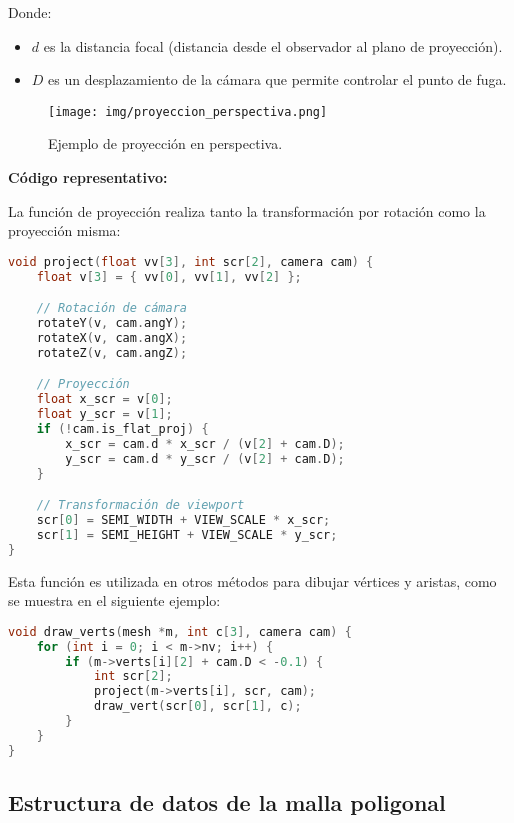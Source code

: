 \documentclass[12pt]{article}
\begin{document}
    Donde:
    \begin{itemize}
        \item \( d \) es la distancia focal (distancia desde el observador al plano de proyección).
        \item \( D \) es un desplazamiento de la cámara que permite controlar el punto de fuga.
    \end{itemize}

    \begin{figure}[H]
        \centering
        \texttt{[image: img/proyeccion\_perspectiva.png]}
        \caption{Ejemplo de proyección en perspectiva.}
    \end{figure}

    \textbf{Código representativo:}

    La función de proyección realiza tanto la transformación por rotación como la proyección misma:

    \begin{lstlisting}[language=C, caption={Función de proyección 3D a 2D}]
void project(float vv[3], int scr[2], camera cam) {
    float v[3] = { vv[0], vv[1], vv[2] };

    // Rotación de cámara
    rotateY(v, cam.angY);
    rotateX(v, cam.angX);
    rotateZ(v, cam.angZ);

    // Proyección
    float x_scr = v[0];
    float y_scr = v[1];
    if (!cam.is_flat_proj) {
        x_scr = cam.d * x_scr / (v[2] + cam.D);
        y_scr = cam.d * y_scr / (v[2] + cam.D);
    }

    // Transformación de viewport
    scr[0] = SEMI_WIDTH + VIEW_SCALE * x_scr;
    scr[1] = SEMI_HEIGHT + VIEW_SCALE * y_scr;
}
    \end{lstlisting}

    Esta función es utilizada en otros métodos para dibujar vértices y aristas, como se muestra en el siguiente ejemplo:

    \begin{lstlisting}[language=C, caption={Dibujo de vértices usando proyección}]
void draw_verts(mesh *m, int c[3], camera cam) {
    for (int i = 0; i < m->nv; i++) {
        if (m->verts[i][2] + cam.D < -0.1) {
            int scr[2];
            project(m->verts[i], scr, cam);
            draw_vert(scr[0], scr[1], c);
        }
    }
}
    \end{lstlisting}


    \subsection{Estructura de datos de la malla poligonal}
\end{document}
